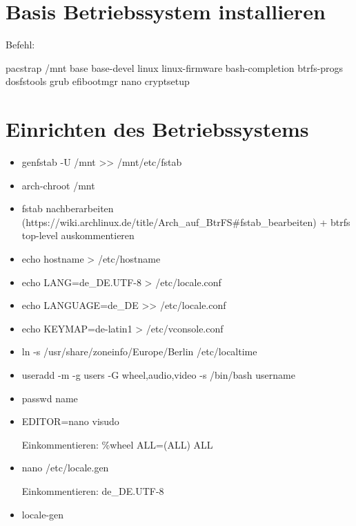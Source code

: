 \documentclass[11pt,a4paper]{article}
\begin{document}
\section{Basis Betriebssystem installieren}
Befehl:

pacstrap /mnt base base-devel linux linux-firmware bash-completion btrfs-progs dosfstools grub efibootmgr nano cryptsetup
\section{Einrichten des Betriebssystems}
\begin{itemize}
\item genfstab -U /mnt >{}> /mnt/etc/fstab
\item arch-chroot /mnt
\item fstab nachberarbeiten (https://wiki.archlinux.de/title/Arch\_auf\_BtrFS\#fstab\_bearbeiten) + btrfs top-level auskommentieren
\item echo \grqq{}hostname\grqq{} > /etc/hostname
\item echo LANG=de\_DE.UTF-8 > /etc/locale.conf
\item echo LANGUAGE=de\_DE >{}> /etc/locale.conf
\item echo KEYMAP=de-latin1 > /etc/vconsole.conf
\item ln -s /usr/share/zoneinfo/Europe/Berlin /etc/localtime
\item useradd -m -g users -G wheel,audio,video -s /bin/bash \glqq{}username\grqq{} 
\item passwd \glqq{}name\grqq{}
\item EDITOR=nano visudo

Einkommentieren: \%wheel ALL=(ALL) ALL
\item nano /etc/locale.gen

Einkommentieren: de\_DE.UTF-8
\item locale-gen

\end{itemize}
\end{document}
